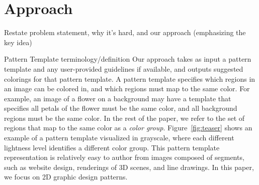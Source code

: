 \section{Approach}
\label{sec:approach}


Restate problem statement, why it's hard, and our approach (emphasizing the key idea)~

Pattern Template terminology/definition
Our approach takes as input a pattern template and any user-provided guidelines if available, and outputs suggested colorings for that pattern template. A pattern template specifies which regions in an image can be colored in, and which regions must map to the same color. For example, an image of a flower on a background may have a template that specifies all petals of the flower must be the same color, and all background regions must be the same color. In the rest of the paper, we refer to the set of regions that map to the same color as a \emph{color group}. Figure~\ref{fig:teaser} shows an example of a pattern template visualized in grayscale, where each different lightness level identifies a different color group. This pattern template representation is relatively easy to author from images composed of segments, such as website design, renderings of 3D scenes, and line drawings. In this paper, we focus on 2D graphic design patterns. 



